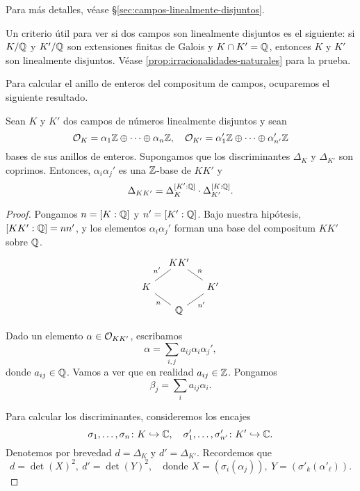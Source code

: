 Para más detalles, véase \S\ref{sec:campos-linealmente-disjuntos}.

\begin{comentario}
  Un criterio útil para ver si dos campos son linealmente disjuntos es
  el siguiente: si $K/\mathbb{Q}$ y $K'/\mathbb{Q}$ son extensiones finitas de Galois y
  $K \cap K' = \mathbb{Q}$, entonces $K$ y $K'$ son linealmente disjuntos.
  Véase \ref{prop:irracionalidades-naturales} para la prueba.
\end{comentario}

Para calcular el anillo de enteros del compositum de campos, ocuparemos
el siguiente resultado.

\begin{proposicion}
  \label{prop:OK-del-compositum}
  Sean $K$ y $K'$ dos campos de números linealmente disjuntos y sean
  \[ \mathcal{O}_K = \alpha_1 \mathbb{Z} \oplus \cdots \oplus \alpha_n \mathbb{Z}, \quad
     \mathcal{O}_{K'} = \alpha_1' \mathbb{Z} \oplus \cdots \oplus \alpha_{n'}' \mathbb{Z} \]
  bases de sus anillos de enteros. Supongamos que los discriminantes $\Delta_K$
  y $\Delta_{K'}$ son coprimos. Entonces, $\alpha_i \alpha_j'$ es una
  $\mathbb{Z}$-base de $KK'$ y
  $$\Delta_{KK'} = \Delta_K^{[K' : \mathbb{Q}]} \cdot \Delta_{K'}^{[K : \mathbb{Q}]}.$$

  \begin{proof}
    Pongamos $n = [K : \mathbb{Q}]$ y $n' = [K' : \mathbb{Q}]$.
    Bajo nuestra hipótesis, $[KK' : \mathbb{Q}] = nn'$, y los elementos
    $\alpha_i \alpha_j'$ forman una base del compositum $KK'$ sobre $\mathbb{Q}$.
    \[ \begin{tikzcd}[row sep=1em,column sep=1em]
      & KK'\ar[-]{dl}[swap]{n'} \ar[-]{dr}{n} \\
      K\ar[-]{dr}[swap]{n} & & K'\ar[-]{dl}{n'} \\
      & \QQ
    \end{tikzcd} \]

    Dado un elemento $\alpha \in \mathcal{O}_{KK'}$, escribamos
    $$\alpha = \sum_{i,j} a_{ij} \alpha_i \alpha_j',$$
    donde $a_{ij} \in \mathbb{Q}$. Vamos a ver que en realidad $a_{ij} \in \mathbb{Z}$.
    Pongamos
    $$\beta_j = \sum_i a_{ij} \alpha_i.$$

    Para calcular los discriminantes, consideremos los encajes
    \[ \sigma_1, \ldots, \sigma_n\colon K \hookrightarrow \mathbb{C}, \quad
       \sigma'_1, \ldots, \sigma'_{n'}\colon K' \hookrightarrow \mathbb{C}. \]
    Denotemos por brevedad $d = \Delta_K$ y $d' = \Delta_{K'}$.
    Recordemos que
    \[ d = \det (X)^2, ~ d' = \det (Y)^2,
       \quad \text{donde }
       X = (\sigma_i (\alpha_j)), ~
       Y = (\sigma'_k (\alpha'_\ell)). \]


\end{proof}
\end{proposicion}
